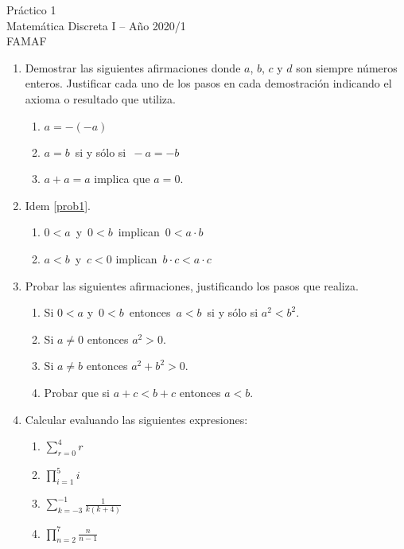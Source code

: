 \documentclass[12pt,spanish,makeidx]{amsbook}
\begin{document}
{\bf \begin{center} Práctico 1 \\ Matemática Discreta I -- Año 2020/1 \\ FAMAF \end{center}}

\smallskip

\begin{enumerate}


\item\label{prob1} Demostrar las siguientes afirmaciones donde $a$, $b$, $c$ y $d$ son siempre números enteros. Justificar cada uno de los pasos en cada demostración indicando el axioma o resultado que utiliza.
\begin{enumerate}
\item  $a=-(-a)$
\item  $a=b\,$ si y sólo si $\,-a=-b$
\item  $a+a=a$ implica que  $a=0$.
\end{enumerate}


\medskip

\item Idem \ref{prob1}.

\begin{enumerate}
 \item $0<a\,$ y $\,0<b\,$ implican $\,0<a\cdot b$
 \item $a<b\,$ y $\,c<0$ implican $\,b\cdot c<a\cdot c$
\end{enumerate}

\medskip

\item  Probar las siguientes afirmaciones, justificando los pasos que realiza.
\begin{enumerate}
  \item Si $0 < a$  y $\,0<b\,$ entonces $\,a<b\,$ si y sólo si $a^2<b^2$.
  \item Si $a\neq 0$  entonces $a^2>0$.
  \item Si $a\neq b$  entonces $a^2+b^2>0$.
  \item Probar que si $a+c <b+c$ entonces $a<b$.
\end{enumerate}


\smallskip


\item Calcular evaluando las siguientes expresiones:
\begin{multicols}{4}
 \begin{enumerate}
\item \quad $\displaystyle{\sum_{r=0}^4 r}$
\item \quad $\displaystyle{\prod_{i=1}^5 i}$
\item  \quad $\displaystyle{\sum_{k=-3}^{-1} \frac{1}{k(k+4)}}$
\item \quad $\displaystyle{\prod_{n=2}^7 \frac{n}{n-1}}$
\end{enumerate}
\end{multicols}





\end{enumerate}
\end{document}
